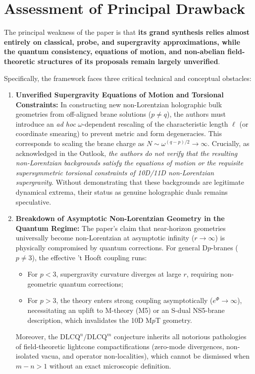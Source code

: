 \documentclass[11pt,a4paper]{article}
\begin{document}
\section{Assessment of Principal Drawback}
\label{sec:drawback}

The principal weakness of the paper is that \textbf{its grand synthesis relies almost entirely on classical, probe, and supergravity approximations, while the quantum consistency, equations of motion, and non-abelian field-theoretic structures of its proposals remain largely unverified}. 

Specifically, the framework faces three critical technical and conceptual obstacles:

\begin{enumerate}
    \item \textbf{Unverified Supergravity Equations of Motion and Torsional Constraints:}
    In constructing new non-Lorentzian holographic bulk geometries from off-aligned brane solutions ($p \neq q$), the authors must introduce an \emph{ad hoc} $\omega$-dependent rescaling of the characteristic length $\ell$ (or coordinate smearing) to prevent metric and form degeneracies. This corresponds to scaling the brane charge as $N \sim \omega^{(q-p)/2} \to \infty$. 
    Crucially, as acknowledged in the Outlook, \emph{the authors do not verify that the resulting non-Lorentzian backgrounds satisfy the equations of motion or the requisite supersymmetric torsional constraints of 10D/11D non-Lorentzian supergravity}. Without demonstrating that these backgrounds are legitimate dynamical extrema, their status as genuine holographic duals remains speculative.

    \item \textbf{Breakdown of Asymptotic Non-Lorentzian Geometry in the Quantum Regime:}
    The paper's claim that near-horizon geometries universally become non-Lorentzian at asymptotic infinity ($r \to \infty$) is physically compromised by quantum corrections. For general D$p$-branes ($p \neq 3$), the effective 't Hooft coupling runs:
    \begin{itemize}
        \item For $p < 3$, supergravity curvature diverges at large $r$, requiring non-geometric quantum corrections;
        \item For $p > 3$, the theory enters strong coupling asymptotically ($e^\Phi \to \infty$), necessitating an uplift to M-theory (M5) or an S-dual NS5-brane description, which invalidates the 10D M$p$T geometry.
    \end{itemize}
    Moreover, the $\text{DLCQ}^n/\text{DLCQ}^m$ conjecture inherits all notorious pathologies of field-theoretic lightcone compactifications (zero-mode divergences, non-isolated vacua, and operator non-localities), which cannot be dismissed when $m-n > 1$ without an exact microscopic definition.


\end{enumerate}
\end{document}
